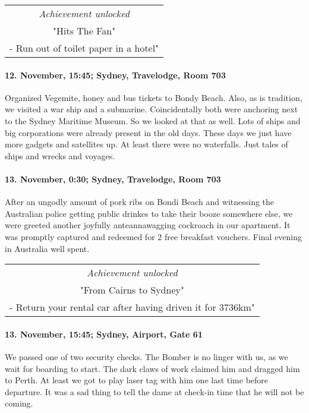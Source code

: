 \begin{center}
\begin{tabular}{||c||}
\emph{Achievement unlocked}\\
"Hits The Fan"\\
\multicolumn{1}{||p{0.8\textwidth}||}{\footnotesize - Run out of toilet paper in a hotel"} \\
\end{tabular}
\end{center}

\paragraph{12. November, 15:45; Sydney, Travelodge, Room 703}
Organized Vegemite, honey and bus tickets to Bondy Beach.
Also, as is tradition, we visited a war ship and a submarine.
Coincidentally both were anchoring next to the Sydney Maritime Museum.
So we looked at that as well.
Lots of ships and big corporations were already present in the old days.
These days we just have more gadgets and satellites up.
At least there were no waterfalls.
Just tales of ships and wrecks and voyages.

\paragraph{13. November, 0:30; Sydney, Travelodge, Room 703}
After an ungodly amount of pork ribs on Bondi Beach and witnessing the Australian police getting public drinkes to take their booze somewhere else, we were greeted another joyfully anteannawagging cockroach in our apartment.
It was promptly captured and redeemed for 2 free breakfast vouchers.
Final evening in Australia well spent.

\begin{center}
\begin{tabular}{||c||}
\emph{Achievement unlocked}\\
"From Cairns to Sydney"\\
\multicolumn{1}{||p{0.8\textwidth}||}{\footnotesize - Return your rental car after having driven it for 3736km"} \\
\end{tabular}
\end{center}

\paragraph{13. November, 15:45; Sydney, Airport, Gate 61}
We passed one of two security checks.
The Bomber is no linger with us, as we wait for boarding to start.
The dark claws of work claimed him and dragged him to Perth.
At least we got to play laser tag with him one last time before departure.
It was a sad thing to tell the dame at check-in time that he will not be coming.

